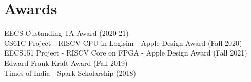 \documentclass[]{deedy-resume-openfont}
\begin{document}
\begin{minipage}[t]{0.33\textwidth}

\section{Awards}

EECS Oustanding TA Award (2020-21) \\
CS61C Project - RISCV CPU in Logisim - Apple Design Award (Fall 2020) \\
EECS151 Project - RISCV Core on FPGA - Apple Design Award (Fall 2021) \\
Edward Frank Kraft Award (Fall 2019) \\
Times of India - Spark Scholarship (2018)


%
%

\end{minipage} 
\hfill
\end{document}
